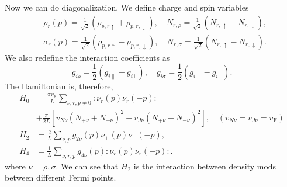 \documentclass[hyperref, a4paper]{article}
\begin{document}
Now we can do diagonalization. We define charge and spin variables 
\begin{equation}
    \begin{aligned}
        &\rho_r(p) = \frac{1}{\sqrt{2}} (\rho_{p, r \uparrow} + \rho_{p, r, \downarrow}), \quad 
        N_{r, \rho} = \frac{1}{\sqrt{2}} (N_{r, \uparrow} + N_{r, \downarrow}), \\
        &\sigma_r(p) = \frac{1}{\sqrt{2}} (\rho_{p, r \uparrow} - \rho_{p, r, \downarrow}), \quad 
        N_{r, \sigma} = \frac{1}{\sqrt{2}} (N_{r, \uparrow} - N_{r, \downarrow}).
    \end{aligned}
\end{equation}
We also redefine the interaction coefficients as 
\begin{equation}
    g_{i \rho} = \frac{1}{2} (g_{i \parallel} + g_{i \bot}), \quad g_{i \sigma} = \frac{1}{2} (g_{i \parallel} - g_{i \bot}).
\end{equation}
The Hamiltonian is, therefore, 
\begin{equation}
    \begin{aligned}
        H_{0} &=\frac{\pi v_\text{F}}{L} \sum_{\nu, r, p \neq 0}: \nu_{r}(p) \nu_{r}(-p): \\
        &+\frac{\pi}{2 L}\left[v_{N \nu}\left(N_{+\nu}+N_{-\nu}\right)^{2}+v_{J \nu}\left(N_{+\nu}-N_{-\nu}\right)^{2}\right], \quad\left(v_{N \nu}=v_{J \nu}=v_\text{F}\right) \\
        H_{2} &=\frac{2}{L} \sum_{\nu, p} g_{2 \nu}(p) \nu_{+}(p) \nu_{-}(-p), \\
        H_{4} &=\frac{1}{L} \sum_{\nu , r, p} g_{4 \nu}(p): \nu_{r}(p) \nu_{r}(-p):.
        \end{aligned}
\end{equation}
where $\nu = \rho, \sigma$. We can see that $H_2$ is the interaction between density mods between different Fermi points.




\end{document}
